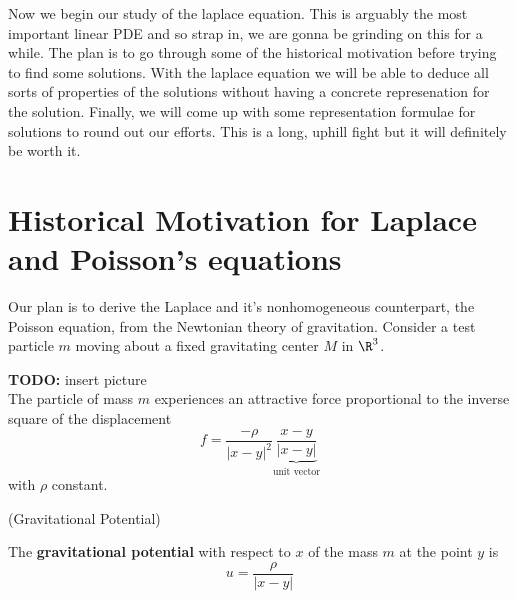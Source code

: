 \documentclass{bkcnotes}
\newcommand{\todo}[1]{{\bf TODO: } #1\\}
\begin{document}
\maketitle

Now we begin our study of the laplace equation. This is arguably the
most important linear PDE and so strap in, we are gonna be grinding on
this for a while. The plan is to go through some of the historical
motivation before trying to find some solutions. With the laplace
equation we will be able to deduce all sorts of properties of the
solutions without having a concrete represenation for the
solution. Finally, we will come up with some representation formulae
for solutions to round out our efforts. This is a long, uphill fight
but it will definitely be worth it.

\section{Historical Motivation for Laplace \\ and Poisson's equations}

Our plan is to derive the Laplace and it's nonhomogeneous counterpart,
the Poisson equation, from the Newtonian theory of
gravitation. Consider a test particle $m$ moving about a fixed
gravitating center $M$ in $\R^3$.

\todo{insert picture}

The particle of mass $m$ experiences an attractive force proportional
to the inverse square of the displacement
\begin{equation}
  \label{eq:inverse-square}
  f = \frac{-\rho}{|x-y|^2}\underbrace{\frac{x-y}{|x-y|}}_{\text{unit vector}}
\end{equation}
with $\rho$ constant.

\begin{ndefn}(Gravitational Potential)

  The \textbf{gravitational
    potential} with respect to $x$ of the mass $m$ at the point $y$ is
  \begin{equation}
    \label{eq:potential}
    u = \frac{\rho}{|x-y|}
  \end{equation}
\end{ndefn}
\end{document}
